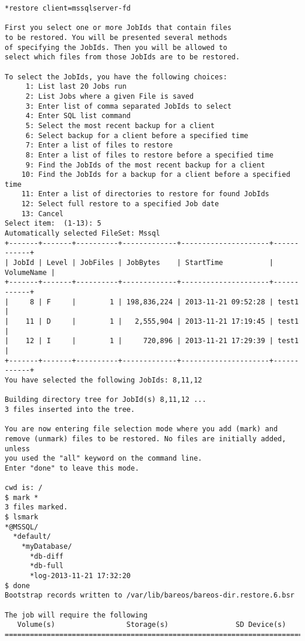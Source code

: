 \footnotesize
\begin{verbatim}
*restore client=mssqlserver-fd

First you select one or more JobIds that contain files
to be restored. You will be presented several methods
of specifying the JobIds. Then you will be allowed to
select which files from those JobIds are to be restored.

To select the JobIds, you have the following choices:
     1: List last 20 Jobs run
     2: List Jobs where a given File is saved
     3: Enter list of comma separated JobIds to select
     4: Enter SQL list command
     5: Select the most recent backup for a client
     6: Select backup for a client before a specified time
     7: Enter a list of files to restore
     8: Enter a list of files to restore before a specified time
     9: Find the JobIds of the most recent backup for a client
    10: Find the JobIds for a backup for a client before a specified time
    11: Enter a list of directories to restore for found JobIds
    12: Select full restore to a specified Job date
    13: Cancel
Select item:  (1-13): 5
Automatically selected FileSet: Mssql
+-------+-------+----------+-------------+---------------------+------------+
| JobId | Level | JobFiles | JobBytes    | StartTime           | VolumeName |
+-------+-------+----------+-------------+---------------------+------------+
|     8 | F     |        1 | 198,836,224 | 2013-11-21 09:52:28 | test1      |
|    11 | D     |        1 |   2,555,904 | 2013-11-21 17:19:45 | test1      |
|    12 | I     |        1 |     720,896 | 2013-11-21 17:29:39 | test1      |
+-------+-------+----------+-------------+---------------------+------------+
You have selected the following JobIds: 8,11,12

Building directory tree for JobId(s) 8,11,12 ...
3 files inserted into the tree.

You are now entering file selection mode where you add (mark) and
remove (unmark) files to be restored. No files are initially added, unless
you used the "all" keyword on the command line.
Enter "done" to leave this mode.

cwd is: /
$ mark *
3 files marked.
$ lsmark
*@MSSQL/
  *default/
    *myDatabase/
      *db-diff
      *db-full
      *log-2013-11-21 17:32:20
$ done
Bootstrap records written to /var/lib/bareos/bareos-dir.restore.6.bsr

The job will require the following
   Volume(s)                 Storage(s)                SD Device(s)
===========================================================================


\end{verbatim}
